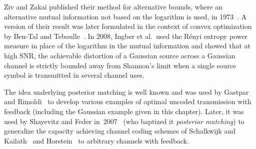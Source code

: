 Ziv and Zakai published their method for alternative bounds, where an
alternative mutual information not based on the logarithm is used, in
1973~\cite{ZivZ1973}. A version of their result was later formulated in the
context of convex optimization by Ben-Tal and Teboulle~\cite{BenTalT1988}. In
2008, Ingber et al.\ used the R\'enyi entropy power measure in place of the
logarithm in the mutual information and showed that at high SNR, the achievable
distortion of a Gaussian source across a Gaussian channel is strictly bounded
away from Shannon's limit when a single source symbol is transmitted in several
channel uses. 

The idea underlying posterior matching is well known and was used by Gastpar and
Rimoldi~\cite{GastparR2003} to develop various examples of optimal uncoded
transmission with feedback (including the Gaussian example given in this
chapter). Later, it was used by Shayevitz and Feder
in~2007~\cite{ShayevitzF2007,ShayevitzF2008} (who baptized it \emph{posterior
matching}) to generalize the capacity achieving channel coding schemes of
Schalkwijk and Kailath~\cite{SchalkwijkK1966} and Horstein~\cite{Horstein1963}
to arbitrary channels with feedback.





